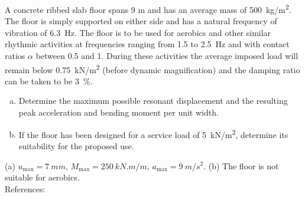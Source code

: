 
\begin{Exercise}[label={footfall_analysis}]
A concrete ribbed slab floor spans 9 m and has an average mass of \SI{500}{kg/m^2}. The floor is simply supported on either side and has a natural frequency of vibration of \SI{6.3}{Hz}. 
The floor is to be used for aerobics and other similar rhythmic activities at frequencies ranging from 1.5 to \SI{2.5}{Hz} and with contact ratios $\alpha$ between 0.5 and 1. During these activities the average imposed load will remain below \SI{0.75}{kN/m^2} (before dynamic magnification) and the damping ratio can be taken to be \SI{3}{\%}.

\begin{enumerate}[(a)]
    \item Determine the maximum possible resonant displacement and the resulting peak acceleration and bending moment per unit width.
    \item If the floor has been designed for a service load of \SI{5}{kN/m^2}, determine its suitability for the proposed use.
\end{enumerate}

\begin{center}
\hspace{1em}
\end{center}

\shortAnswer (a) $u_\text{max} = \SI{7}{mm}$, $M_\text{max} = \SI{250}{kN.m/m}$, $a_\text{max} = \SI{9}{m/s^2}$. (b) The floor is not suitable for aerobics.\\
References: \cite{chopra}
\end{Exercise}



